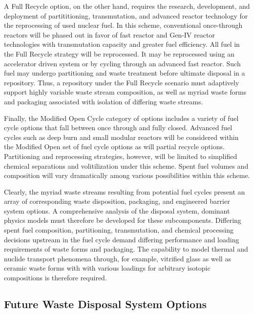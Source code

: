 A Full Recycle option, on the other hand, requires the research, 
development, and deployment of partititioning, transmutation, and 
advanced reactor technology for the reprocessing of used nuclear fuel.  
In this scheme, conventional once-through reactors will be phased out 
in favor of fast reactor and Gen-IV reactor technologies with 
transmutation capacity and greater fuel efficiency. All fuel in the 
Full Recycle strategy will be reprocessed. It may be reprocessed using  
an accelerator driven system or by cycling through an advanced fast 
reactor. Such fuel may undergo partitioning and waste treatment before 
ultimate disposal in a repository. Thus, a repository under the Full 
Recycle scenario must adaptively support highly variable waste stream 
composition, as well as myriad waste forms and packaging associated 
with isolation of differing waste streams.

Finally, the Modified Open Cycle category of options includes a 
variety of fuel cycle options that fall between once through and fully 
closed. Advanced fuel cycles such as deep burn and small modular 
reactors will be considered within the Modified Open set of fuel cycle 
options as will partial recycle options. Partitioning and reprocessing 
strategies, however, will be limited to simplified chemical 
separations and volitilization under this scheme. Spent fuel volumes 
and composition will vary dramatically among various possibilities 
within this scheme.  
\cite{department_of_energy_-_nuclear_energy_nuclear_2010} 

Clearly, the myriad waste streams resulting from potential fuel cycles 
present an array of corresponding waste disposition, packaging, and 
engineered barrier system options. A comprehensive analysis of the 
disposal system, dominant physics models must therefore be developed 
for these subcomponents.  Differing spent fuel composition, 
partitioning, transmutation, and chemical processing decisions 
upstream in the fuel cycle demand differing performance and loading 
requirements of waste forms and packaging. The capability to model 
thermal and nuclide transport phenomena through, for example, 
vitrified glass as well as ceramic waste forms with with various 
loadings for arbitrary isotopic compositions is therefore required.  

\subsection{Future Waste Disposal System Options}

